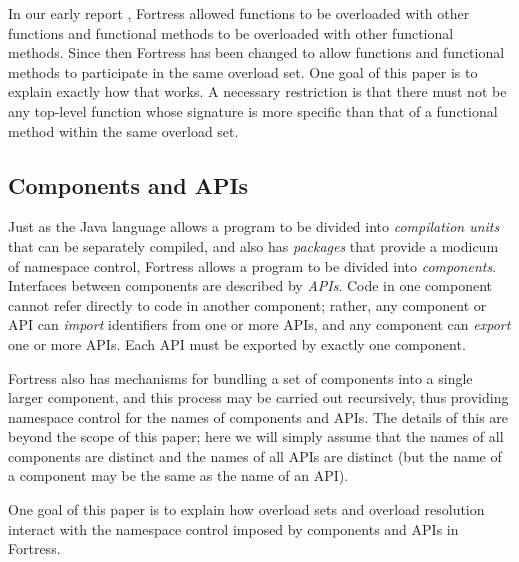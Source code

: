 In our early report \cite{FORTRESS-MODULAR-MULTIPLE-DISPATCH}, Fortress allowed functions to be overloaded with other
functions and functional methods to be overloaded with other functional methods.
Since then Fortress has been changed to allow functions and functional
methods to participate in the same overload set.  One goal of this paper
is to explain exactly how that works.  A necessary restriction is that
there must not be any top-level function
whose signature is more specific than that of a functional method
within the same overload set.

\subsection{Components and APIs}

Just as the Java language allows a program to be divided into \emph{compilation units}
that can be separately compiled, and also has \emph{packages} that provide
a modicum of namespace control, Fortress allows a program to be divided
into \emph{components}.  Interfaces between components are described
by \emph{APIs}.  Code in one component cannot refer directly to code
in another component; rather, any component or API can \emph{import}
identifiers from one or more APIs, and any component can \emph{export}
one or more APIs.  Each API must be exported by exactly one component.

Fortress also has mechanisms for bundling a set of components into
a single larger component, and this process may be carried out recursively,
thus providing namespace control for the names of components and APIs.
The details of this are beyond the scope of this paper; here we will simply
assume that the names of all components are distinct and the names
of all APIs are distinct (but the name of a component may be the same
as the name of an API).

One goal of this paper is to explain how overload sets and overload
resolution interact with the namespace control imposed by components
and APIs in Fortress.

